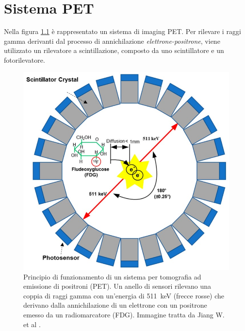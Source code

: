 \chapter{Sistema PET}
Nella figura \ref{fig:PET_imaging_system} è rappresentato un sistema di imaging PET. Per rilevare i raggi gamma derivanti dal processo di annichilazione \textit{elettrone-positrone}, viene utilizzato un rilevatore a scintillazione, composto da uno scintillatore e un fotorilevatore. 
\begin{figure}[h]
	\centering
	\includegraphics[width=0.45\linewidth]{./ImageFiles/PET_imaging_system}
	\caption{Principio di funzionamento di un sistema per tomografia ad emissione di positroni (PET). Un anello di sensori rilevano una coppia di raggi gamma con un'energia di \SI{511}{\kilo\electronvolt} (frecce rosse) che derivano dalla annichilazione di un elettrone con un positrone emesso da un radiomarcatore (FDG). Immagine tratta da Jiang W. et al \cite{Jiang2019}.}
	\label{fig:PET_imaging_system}
\end{figure}

